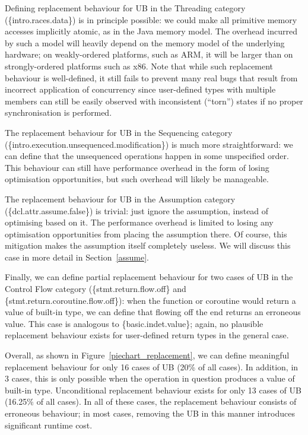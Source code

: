 Defining replacement behaviour for UB in the Threading category (\{intro.races.data\}) is in principle possible: we could make all primitive memory accesses implicitly atomic, as in the Java memory model. The overhead incurred by such a model will heavily depend on the memory model of the underlying hardware; on weakly-ordered platforms, such as ARM,
it will be larger than on strongly-ordered platforms such as x86. Note that while such replacement behaviour is well-defined, it still fails to prevent many real bugs that result from incorrect application of concurrency since user-defined types with multiple members can still be easily observed with inconsistent (``torn'') states if no proper synchronisation is performed.


The replacement behaviour for UB in the Sequencing category (\{intro.execution.unsequenced.modifica\-tion\}) is much more straightforward: we can define that the unsequenced operations happen in some unspecified order. This behaviour can still have performance overhead in the form of losing  optimisation opportunities, but such overhead will likely be manageable. 


The replacement behaviour for UB in the Assumption category (\{dcl.attr.assume.false\}) is trivial: just ignore the assumption, instead of optimising based on it. The performance overhead is limited to losing any optimisation opportunities from placing the assumption there. Of course, this mitigation makes the assumption itself completely useless. We will discuss this case in more detail in Section~\ref{assume}.

Finally, we can define partial replacement behaviour for two cases of UB in the Control Flow category  (\{stmt.return.flow.off\} and \{stmt.return.coroutine.flow.off\}): when the function or coroutine would return a value of built-in type, we can define that flowing off the end returns an erroneous value. This case is analogous to \{basic.indet.value\}; again, no plausible replacement behaviour exists for user-defined return types in the general case.

Overall, as shown in Figure~\ref{piechart_replacement}, we can define meaningful replacement behaviour for only 16 cases of UB (20\% of all cases). In addition, in 3 cases, this is only possible when the operation in question produces a value of built-in type. Unconditional replacement behaviour exists for only 13 cases of UB (16.25\% of all cases). In all of these cases, the replacement behaviour consists of erroneous behaviour; in most cases, removing the UB in this manner introduces significant runtime cost.


